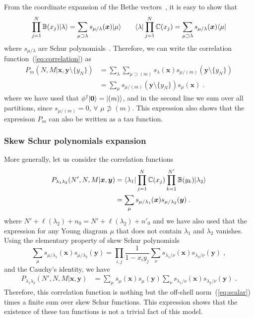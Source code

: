 \documentclass[a4paper,11pt]{amsart}
\begin{document}
From the coordinate expansion of the Bethe
vectors~\cite{Bogoliubov2005, Tsilevich:2006}, it is easy to show that
\begin{equation}
\prod_{j=1}^N \mathbb{B}(x_j)\lvert\lambda\rangle  = \sum_{\mu \supset \lambda } s_{\mu/\lambda}(\bm{x})\lvert\mu\rangle\qquad 
 \langle\lambda\rvert \prod_{j=1}^N \mathbb{C}(x_j) = \sum_{\mu \supset \lambda } s_{\mu/\lambda}(\bm{x})\langle\mu\rvert
\end{equation}
where \(s_{\mu/\lambda}\) are Schur polynomials~\cite{Macdonald:1998}.
Therefore, we can write the correlation function~(\ref{eq:correlation}) as 
\begin{equation}
\begin{split}
  P_m(N, M|\bm{x}, \bm{y}\setminus \{y_N\})
  & = \sum_\lambda \sum_{\mu \supset (m)} s_{\lambda}(\bm{x}) s_{\mu/(m)}(\bm{y}\setminus\{y_N\})\\
  & = \sum_\mu s_{\mu/(m)}(\bm{y}\setminus\{y_N\}) s_{\mu}(\bm{x})\; .
\end{split}
\end{equation}
where we have used that \(\phi^\dagger \lvert\bm{0}\rangle = \lvert(m)\rangle\), and in the second line
we sum over all partitions, since \(s_{\mu/(m)} = 0\), \(\forall \) \(\mu \not \supset (m)\).
This expression also shows that the expresison \(P_m\) can also be written as a tau function. 

\subsubsection{Skew Schur polynomials expansion}
More generally, let us consider the correlation functions 
\begin{equation}
\begin{split}
  P_{\lambda_1 \lambda_2}(N', N, M|\bm{x}, \bm{y}) & =
  \langle\lambda_1\rvert \prod_{j=1}^N \mathbb{C}(x_j)
  \prod_{k=1}^{N'} \mathbb{B}(y_k)\lvert\lambda_2\rangle \\
  & = \sum_{\mu} s_{\mu/\lambda_1}(\bm{x}) s_{\mu/\lambda_2}(\bm{y}) \; .
\end{split}
\end{equation}
where \(N' + \ell(\lambda_2) + n_0 = N' + \ell(\lambda_2) + n'_0\) and 
we have also used that the expression for any Young diagram
\(\mu\) that does not contain \(\lambda_1\) and \(\lambda_2\)
vanishes. Using the elementary property of skew Schur
polynomials~\cite{Macdonald:1998}
\begin{equation}
  \sum_{\mu} s_{\mu/\lambda_1}(\bm{x}) s_{\mu/\lambda_2}(\bm{y}) = \prod_{i,j}\frac{1}{1 - x_i y_j}
 \sum_\nu s_{\lambda_1/\nu}(\bm{x}) s_{\lambda_2/\nu}(\bm{y})\; ,
\end{equation}
and the Cauchy's identity, we have 
\begin{equation}
\begin{split}
  P_{\lambda_1 \lambda_2}(N', N, M|\bm{x}, \bm{y}) & =
 \sum_\mu s_{\mu}(\bm{x}) s_{\mu}(\bm{y})
 \sum_\nu s_{\lambda_1/\nu}(\bm{x}) s_{\lambda_2/\nu}(\bm{y})\; .
\end{split}
\end{equation}
Therefore, this correlation function is nothing but the off-shell
norm~(\ref{eq:scalar}) times a finite sum over skew Schur functions.
This expression shows that the existence of these tau functions is not
a trivial fact of this model.
\end{document}
